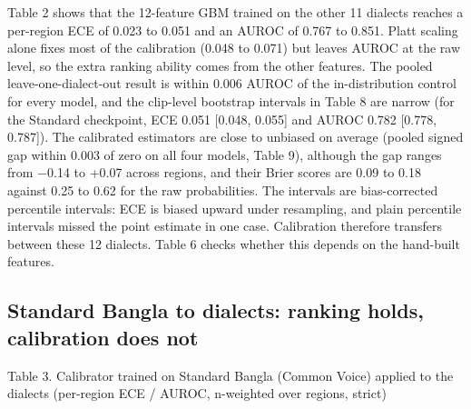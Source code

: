 \documentclass[10pt]{article}
\begin{document}
Table 2 shows that the 12-feature GBM trained on the other 11 dialects reaches a per-region ECE of 0.023 to 0.051 and an AUROC of 0.767 to 0.851. Platt scaling alone fixes most of the calibration (0.048 to 0.071) but leaves AUROC at the raw level, so the extra ranking ability comes from the other features. The pooled leave-one-dialect-out result is within 0.006 AUROC of the in-distribution control for every model, and the clip-level bootstrap intervals in Table 8 are narrow (for the Standard checkpoint, ECE 0.051 [0.048, 0.055] and AUROC 0.782 [0.778, 0.787]). The calibrated estimators are close to unbiased on average (pooled signed gap within 0.003 of zero on all four models, Table 9), although the gap ranges from $-$0.14 to +0.07 across regions, and their Brier scores are 0.09 to 0.18 against 0.25 to 0.62 for the raw probabilities. The intervals are bias-corrected percentile intervals: ECE is biased upward under resampling, and plain percentile intervals missed the point estimate in one case. Calibration therefore transfers between these 12 dialects. Table 6 checks whether this depends on the hand-built features.


\subsection{Standard Bangla to dialects: ranking holds, calibration does not}

\begin{table}[htb]
\centering
\par\noindent\begin{minipage}{\linewidth}\small Table 3. Calibrator trained on Standard Bangla (Common Voice) applied to the dialects (per-region ECE / AUROC, n-weighted over regions, strict)\end{minipage}\par\smallskip
\small
{}
\end{table}
\end{document}

